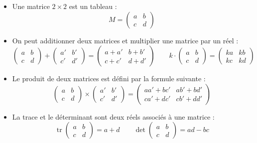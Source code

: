 \documentclass[11pt,class=report,crop=false]{standalone}
\begin{document}
\begin{cours}
\sauteligne
\begin{itemize}
  \item Une matrice $2\times 2$ est un tableau :
$$M = \begin{pmatrix}a&b\\c&d\end{pmatrix}$$
  
  \item On peut additionner deux matrices et multiplier une matrice par un réel :
$$\begin{pmatrix}a&b\\c&d\end{pmatrix}+\begin{pmatrix}a'&b'\\c'&d'\end{pmatrix}
=\begin{pmatrix}a+a'&b+b'\\c+c'&d+d'\end{pmatrix}\qquad
k \cdot \begin{pmatrix}a&b\\c&d\end{pmatrix} = \begin{pmatrix}ka&kb\\kc&kd\end{pmatrix}$$

  \item Le produit de deux matrices est défini par la formule suivante :
$$\begin{pmatrix}a&b\\c&d\end{pmatrix} \times \begin{pmatrix}a'&b'\\c'&d'\end{pmatrix}
= \begin{pmatrix}  aa' + bc' & a b' + bd' \\ ca' + dc'& cb' + dd'\end{pmatrix}$$

  \item La trace et le déterminant sont deux réels associés à une  matrice :
$$\operatorname{tr}\begin{pmatrix}a&b\\c&d\end{pmatrix} = a+d \qquad
\operatorname{det}\begin{pmatrix}a&b\\c&d\end{pmatrix} = ad-bc$$


\end{itemize}
\end{cours}
\end{document}
